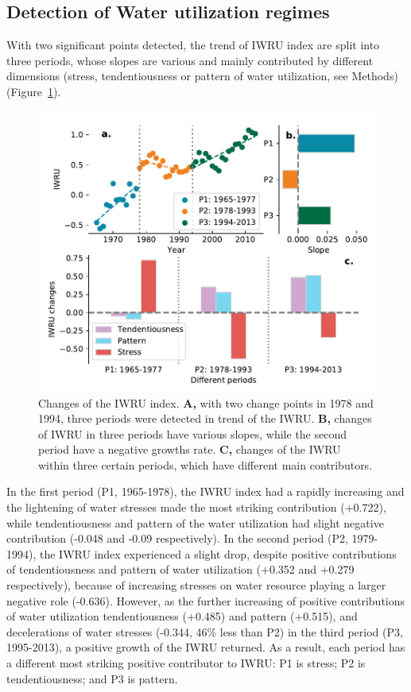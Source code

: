 \documentclass[9pt, twocolumn, twoside, lineno]{pnas-new}
\begin{document}
\subsection*{Detection of Water utilization regimes}
With two significant points detected, the trend of IWRU index are split into three periods, whose slopes are various and mainly contributed by different dimensions (stress, tendentiousness or pattern of water utilization, see Methods) (Figure~\ref{fig:IWRU}).
\begin{figure}%
	\centering
	\includegraphics[width=\linewidth]{../../figures/main/index.pdf}
	\caption{Changes of the IWRU index. 
	\textbf{A,} with two change points in 1978 and 1994, three periods were detected in trend of the IWRU.
	\textbf{B,} changes of IWRU in three periods have various slopes, while the second period have a negative growths rate.
	\textbf{C,} changes of the IWRU within three certain periods, which have different main contributors.
	}
	\label{fig:IWRU}
\end{figure}
In the first period (P1, 1965-1978), the IWRU index had a rapidly increasing and the lightening of water stresses made the most striking contribution (+0.722), while tendentiousness and pattern of the water utilization had slight negative contribution (-0.048 and -0.09 respectively).
In the second period (P2, 1979-1994), the IWRU index experienced a slight drop, despite positive contributions of tendentiousness and pattern of water utilization (+0.352 and +0.279 respectively), because of increasing stresses on water resource playing a larger negative role (-0.636). 
However, as the further increasing of positive contributions of water utilization tendentiousness (+0.485) and pattern (+0.515), and decelerations of water stresses (-0.344, 46\% less than P2) in the third period (P3, 1995-2013), a positive growth of the IWRU returned.
As a result, each period has a different most striking positive contributor to IWRU: P1 is stress; P2 is tendentiousness; and P3 is pattern.
\end{document}
